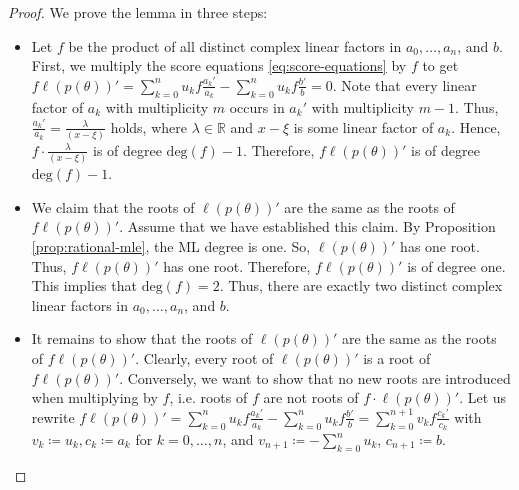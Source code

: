 \begin{proof}
    We prove the lemma in three steps:
    \begin{itemize}
        \item Let \( f \) be the product of all distinct complex linear factors in \( a_0, \dots, a_n\), and \( b \).  First, we multiply the score equations \eqref{eq:score-equations} by \( f \) to get \( f  \ell(p(\theta))' = \sum_{k=0}^n u_k f \frac{a_k'}{a_k} - \sum_{k=0}^n u_k f \frac{b'}{b} = 0 \).
        Note that every linear factor of \( a_k \) with multiplicity \( m \) occurs in \( a_k' \) with multiplicity \( m-1 \). Thus, \( \frac{a_k'}{a_k} = \frac{\lambda}{(x-\xi)} \) holds, where \( \lambda \in \mathbb{R} \) and \( x-\xi \) is some linear factor of \( a_k \). Hence, \( f \cdot  \frac{\lambda}{(x-\xi)}  \) is of degree \( \mathrm{deg}(f) - 1\). Therefore, \( f \ell(p(\theta))' \) is of degree \( \mathrm{deg}(f) - 1\).

        \item We claim that the roots of \( \ell(p(\theta))' \) are the same as the roots of \( f  \ell(p(\theta))' \). Assume that we have established this claim.  By Proposition \ref{prop:rational-mle}, the ML degree is one. So, \( \ell(p(\theta))' \) has one root. Thus, \( f  \ell(p(\theta))' \) has one root. Therefore, \( f  \ell(p(\theta))' \) is of degree one. This implies that \( \mathrm{deg}(f) = 2 \). Thus, there are exactly two distinct complex linear factors in \( a_0, \dots, a_n \), and \( b \).
        
        \item It remains to show that the roots of \( \ell(p(\theta))' \) are the same as the roots of \( f  \ell(p(\theta))' \). Clearly, every root of \( \ell(p(\theta))' \) is a root of \( f  \ell(p(\theta))' \). Conversely, we want to show that no new roots are introduced when multiplying by \( f \), i.e. roots of \( f \) are not roots of \(  f \cdot \ell(p(\theta))' \). Let us rewrite \( f  \ell(p(\theta))' = \sum_{k=0}^n u_k f \frac{a_k'}{a_k} - \sum_{k=0}^n u_k f \frac{b'}{b} = \sum_{k=0}^{n + 1} v_k f \frac{c_k'}{c_k} \)
        with \( v_k \coloneqq u_k, c_k \coloneqq a_k  \) for \( k=0, \dots,n \), and \(  v_{n+1} \coloneqq - \sum_{k=0}^n u_k \), \( c_{n+1} \coloneqq b \).


\end{itemize}
\end{proof}
